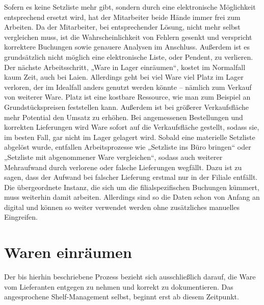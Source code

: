 Sofern es keine Setzliste mehr gibt, sondern durch eine elektronische Möglichkeit entsprechend ersetzt wird, hat der Mitarbeiter beide Hände immer frei zum Arbeiten. Da der Mitarbeiter, bei entsprechender Lösung, nicht mehr selbst vergleichen muss, ist die Wahrscheinlichkeit von Fehlern gesenkt und verspricht korrektere Buchungen sowie genauere Analysen im Anschluss. Außerdem ist es grundsätzlich nicht möglich eine elektronische Liste, oder Pendent, zu verlieren. 
Der nächste Arbeitsschritt, „Ware in Lager einräumen“, kostet im Normalfall kaum Zeit, auch bei Laien. Allerdings geht bei viel Ware viel Platz im Lager verloren, der im Idealfall anders genutzt werden könnte – nämlich zum Verkauf von weiterer  Ware. Platz ist eine kostbare Ressource, wie man zum Beispiel an Grundstückspreisen feststellen kann. Außerdem ist bei größerer Verkaufsfläche mehr Potential den Umsatz zu erhöhen. Bei angemessenen Bestellungen und korrekten Lieferungen wird Ware sofort auf die Verkaufsfläche gestellt, sodass sie, im besten Fall, gar nicht im Lager gelagert wird. 
Sobald eine materielle Setzliste abgelöst wurde, entfallen Arbeitsprozesse wie „Setzliste ins Büro bringen“ oder „Setzliste mit abgenommener Ware vergleichen“, sodass auch weiterer Mehraufwand durch verlorene oder falsche Lieferungen wegfällt. Dazu ist zu sagen, dass der Aufwand bei falscher Lieferung erstmal nur in der Filiale entfällt. Die übergeordnete Instanz, die sich um die filialspezifischen Buchungen kümmert, muss weiterhin damit arbeiten. Allerdings sind so die Daten schon von Anfang an digital und können so weiter verwendet werden ohne zusätzliches manuelles Eingreifen.

\section{Waren einräumen}
\label{waren_einräumen}
Der bis hierhin beschriebene Prozess bezieht sich ausschließlich darauf, die Ware vom Lieferanten entgegen zu nehmen und korrekt zu dokumentieren. Das angesprochene Shelf-Management selbst, beginnt erst ab diesem Zeitpunkt.
\\



